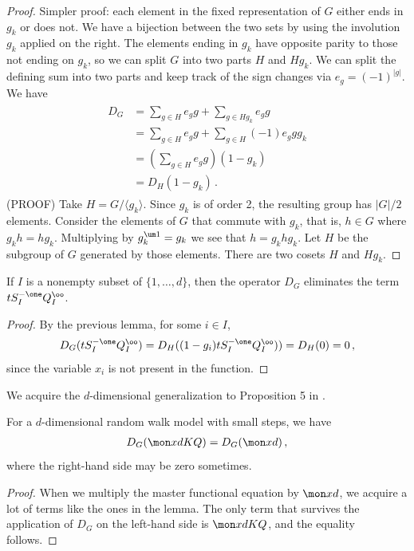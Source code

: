 \begin{proof} Simpler proof: each element in the fixed representation of $G$ either ends in $g_k$ or does not. We have a bijection between the two sets by using the involution $g_k$ applied on the right. The elements ending in $g_k$ have opposite parity to those not ending on $g_k$, so we can split $G$ into two parts $H$ and $Hg_k$. We can split the defining sum into two parts and keep track of the sign changes via $e_g = (-1)^{|g|}$. We have
\begin{align}\begin{split}
	D_G &=\sum_{g \in H} e_g g + \sum_{g \in Hg_k} e_g g\\
	&=\sum_{g \in H} e_g g + \sum_{g \in H} (-1)e_g g g_k\\
	&= \left(\sum_{g \in H} e_g g\right)(1-g_k)\\
	&= D_H(1-g_k)\,.
\end{split}\end{align}
(PROOF) Take $H = G/\langle g_k \rangle$. Since $g_k$ is of order 2, the resulting group has $|G|/2$ elements. Consider the elements of $G$ that commute with $g_k$, that is, $h\in G$ where $g_k h = h g_k$. Multiplying by $g_k^{\um 1} = g_k$ we see that $h = g_k h g_k$. Let $H$ be the subgroup of $G$ generated by those elements. There are two cosets $H$ and $Hg_k$.
\end{proof}
\begin{lemma} If $I$ is a nonempty subset of $\{1,\ldots, d\}$, then the operator $D_G$ eliminates the term $t S_I^{-\one}Q_I^\oo$.
\end{lemma}
\begin{proof} By the previous lemma, for some $i\in I$,
\begin{align}
D_G(t S_I^{-\one}Q_I^\oo) = D_H((1-g_i)t S_I^{-\one}Q_I^\oo)) = D_H(0) = 0\,,
\end{align}
 since the variable $x_i$ is not present in the function.
\end{proof}
We acquire the $d$-dimensional generalization to Proposition 5 in \cite{bousquet2010walks}.
\begin{theorem} For a $d$-dimensional random walk model with small steps, we have
\begin{align}
D_G(\mon xd KQ) = D_G(\mon xd)\,,
\end{align}
where the right-hand side may be zero sometimes.
\end{theorem}
\begin{proof} When we multiply the master functional equation by $\mon xd$, we acquire a lot of terms like the ones in the lemma. The only term that survives the application of $D_G$ on the left-hand side is $\mon xd KQ$, and the equality follows.
\end{proof}

